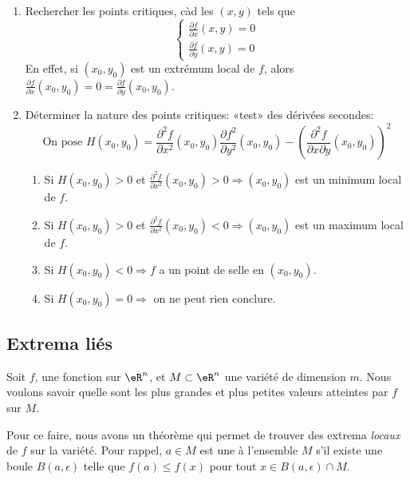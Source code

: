 \begin{enumerate}
\item Rechercher les points critiques, càd les $(x,y)$ tels que
\[\begin{cases} \frac{\partial f}{\partial x}(x,y) = 0 \\ \frac{\partial f}{\partial y}(x,y) = 0 \end{cases} \]
En effet, si $(x_0,y_0)$ est un extrémum local de $f$, alors $\frac{\partial f}{\partial x}(x_0,y_0) = 0 = \frac{\partial f}{\partial y}(x_0,y_0)$.
\item Déterminer la nature des points critiques: «test» des dérivées secondes:
\[\text{On pose }H(x_0,y_0) = \frac{\partial^2 f}{\partial x^2}(x_0,y_0)\frac{\partial f^2}{\partial y^2}(x_0,y_0) - \left(\frac{\partial^2 f}{\partial x\partial y}(x_0,y_0)\right)^2\]
\begin{enumerate}
\item Si $H(x_0,y_0) > 0$ et $\frac{\partial^2 f}{\partial x^2}(x_0,y_0) > 0 \Longrightarrow (x_0,y_0)$ est un minimum local de $f$.
\item Si $H(x_0,y_0) > 0$ et $\frac{\partial^2 f}{\partial x^2}(x_0,y_0) < 0 \Longrightarrow (x_0,y_0)$ est un maximum local de $f$.
\item Si $H(x_0,y_0) < 0 \Longrightarrow f$ a un point de selle en $(x_0,y_0)$.
\item Si $H(x_0,y_0) = 0 \Longrightarrow$ on ne peut rien conclure.
\end{enumerate}
\end{enumerate}

\subsection{Extrema liés}

Soit $f$, une fonction sur $\eR^n$, et $M\subset \eR^n$ une variété de dimension $m$. Nous voulons savoir quelle sont les plus grandes et plus petites valeurs atteintes par $f$ sur $M$.

Pour ce faire, nous avons un théorème qui permet de trouver des extrema \emph{locaux} de $f$ sur la variété. Pour rappel, $a\in M$ est une  à l'ensemble $M$ s'il existe une boule $B(a,\epsilon)$ telle que $f(a)\leq f(x)$ pour tout $x\in B(a,\epsilon)\cap M$.

